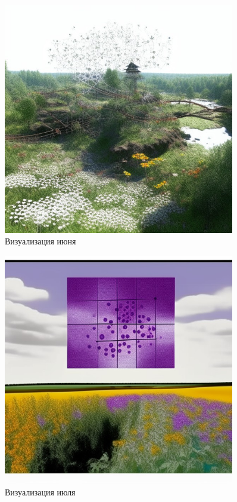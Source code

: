 \begin{figure}[H]
	\caption{Визуализация июня}
	\includegraphics[width=0.9\textwidth]{img/jun.jpeg}
\end{figure}

\begin{figure}[H]
	\caption{Визуализация июля}
	\includegraphics[width=0.9\textwidth]{img/jul.jpeg}
\end{figure}

